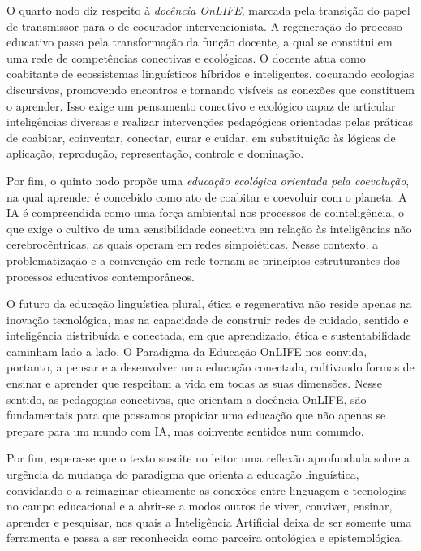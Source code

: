 \documentclass[portuguese]{textolivre}
\begin{document}
O quarto nodo diz respeito à \textit{docência OnLIFE}, marcada pela transição do papel de transmissor para o de cocurador-intervencionista. A regeneração do processo educativo passa pela transformação da função docente, a qual se constitui em uma rede de competências conectivas e ecológicas. O docente atua como coabitante de ecossistemas linguísticos híbridos e inteligentes, cocurando ecologias discursivas, promovendo encontros e tornando visíveis as conexões que constituem o aprender. Isso exige um pensamento conectivo e ecológico capaz de articular inteligências diversas e realizar intervenções pedagógicas orientadas pelas práticas de coabitar, coinventar, conectar, curar e cuidar, em substituição às lógicas de aplicação, reprodução, representação, controle e dominação.

Por fim, o quinto nodo propõe uma \textit{educação ecológica orientada pela coevolução}, na qual aprender é concebido como ato de coabitar e coevoluir com o planeta. A IA é compreendida como uma força ambiental nos processos de cointeligência, o que exige o cultivo de uma sensibilidade conectiva em relação às inteligências não cerebrocêntricas, as quais operam em redes simpoiéticas. Nesse contexto, a problematização e a coinvenção em rede tornam-se princípios estruturantes dos processos educativos contemporâneos.

O futuro da educação linguística plural, ética e regenerativa não reside apenas na inovação tecnológica, mas na capacidade de construir redes de cuidado, sentido e inteligência distribuída e conectada, em que aprendizado, ética e sustentabilidade caminham lado a lado. O Paradigma da Educação OnLIFE nos convida, portanto, a pensar e a desenvolver uma educação conectada, cultivando formas de ensinar e aprender que respeitam a vida em todas as suas dimensões. Nesse sentido, as pedagogias conectivas, que orientam a docência OnLIFE, são fundamentais para que possamos propiciar uma educação que não apenas se prepare para um mundo com IA, mas coinvente sentidos num comundo.

Por fim, espera-se que o texto suscite no leitor uma reflexão aprofundada sobre a urgência da mudança do paradigma que orienta a educação linguística, convidando-o a reimaginar eticamente as conexões entre linguagem e tecnologias no campo educacional e a abrir-se a modos outros de viver, conviver, ensinar, aprender e pesquisar, nos quais a Inteligência Artificial deixa de ser somente uma ferramenta e passa a ser reconhecida como parceira ontológica e epistemológica.
\end{document}
